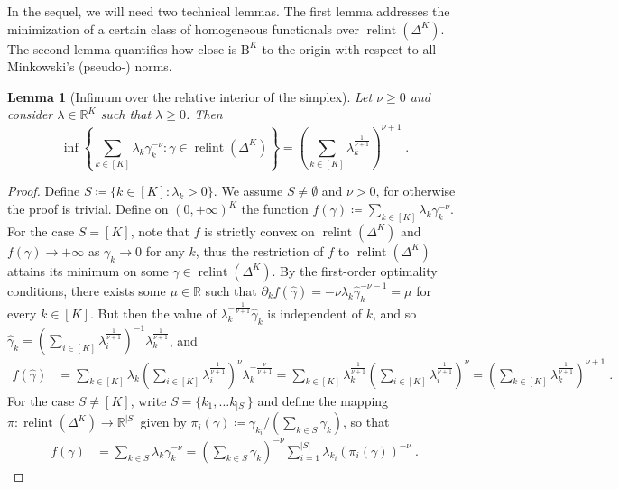 \documentclass[11pt,oneside,a4paper]{article}
\newcommand{\R}{\mathbb{R}}
\newcommand{\lrb}[1]{\left(#1\right)}
\newcommand{\lcb}[1]{\left\{#1\right\}}
\theoremstyle{plain}
\newtheorem{lemma}[theorem]{Lemma}
\theoremstyle{definition}
\theoremstyle{remark}
\newcommand{\simplex}[1]{\Delta^{#1}}
\DeclareMathOperator*{\relint}{relint}
\newcommand{\tsphere}[1]{\mathrm{B}^{#1}}
\begin{document}
In the sequel, we will need two technical lemmas. The first lemma addresses the minimization of a certain class of homogeneous functionals over $\relint{\lrb{\simplex{K}}}$. The second lemma quantifies how close is $\tsphere{K}$ to the origin with respect to all Minkowski's (pseudo-) norms.
\begin{lemma}[Infimum over the relative interior of the simplex]\label{lemma:mini_sum_convex}
Let $\nu \ge 0$ and consider $\lambda \in \R^K$ such that $\lambda \geq 0$.
Then 
\[
    \inf \lcb{
    \sum_{k \in [K]} \lambda_k\gamma_k^{-\nu} :  \gamma \in \relint{\lrb{\simplex{K}}}
    }
=
    \lrb{\sum_{k \in [K]} \lambda_k^{\frac{1}{\nu + 1}}}^{\nu + 1}\;.
\]
\end{lemma}
\begin{proof}
Define $S \coloneq \{k \in [K]: \lambda_k>0\}$. We assume $S \neq \emptyset$ and $\nu > 0$, for otherwise the proof is trivial.
Define on $(0,+\infty)^{K}$ the function $f(\gamma) \coloneq \sum_{k \in [K]}  \lambda_k \gamma_k^{-\nu}$.
For the case $S = [K]$, note that $f$ is strictly convex on $\relint\lrb{\simplex{K}}$ and $f(\gamma) \to +\infty$ as 
$\gamma_k \to 0$ for any $k$,
thus the restriction of $f$ to $\relint\lrb{\simplex{K}}$ attains its minimum on some $\hat{\gamma} \in \relint\lrb{\simplex{K}}$. By the first-order optimality conditions, there exists some $\mu \in \R$ such that $\partial_k f (\hat{\gamma}) =  - \nu \lambda_k \hat{\gamma}_k^{- \nu - 1} = \mu$ for every $k \in [K]$.  
But then the value of 
$\lambda_k^{- \frac{1}{\nu + 1}} \hat{\gamma}_k$ is independent of $k$, and so $\hat{\gamma}_k = \lrb{\sum_{i \in [K]} \lambda_i^{\frac{1}{\nu + 1}} }^{-1}\lambda_k^{\frac{1}{\nu + 1}}$, and
\begin{align*}
    f(\hat{\gamma})
&=
    \sum_{k \in [K]} \lambda_k
    \lrb{\sum_{i \in [K]} \lambda_i^{\frac{1}{\nu + 1}}}^{\nu}
    \lambda_k^{-\frac{\nu }{\nu + 1}}
=
    \sum_{k \in [K]} \lambda_k^{\frac{1}{\nu + 1}}
    \lrb{\sum_{i \in [K]} \lambda_i^{\frac{1}{\nu + 1}}}^{\nu}
=
     \lrb{\sum_{k \in [K]} \lambda_k^{\frac{1}{\nu + 1}} }^{\nu + 1}\;.
\end{align*}
For the case $S \neq [K]$, write $S = \{ k_1, \dots k_{|S|}\}$
and define the mapping $\pi \colon \relint\lrb{\simplex{K}} \to \R^{|S|}$ given by $\pi_i(\gamma) \coloneq  \gamma_{k_i}/ (\sum_{k \in S} \gamma_k)$, so that
\begin{align}\label{eq:gammatilde}
    f(\gamma)
&=
    \sum_{k \in S}  \lambda_k \gamma_k^{-\nu}
=
    \lrb{\sum_{k \in S} \gamma_k}^{-\nu} \sum_{i = 1}^{|S|}  \lambda_{k_i} \lrb{\pi_i(\gamma)}^{-\nu}\;.

\end{align}
\end{proof}
\end{document}
